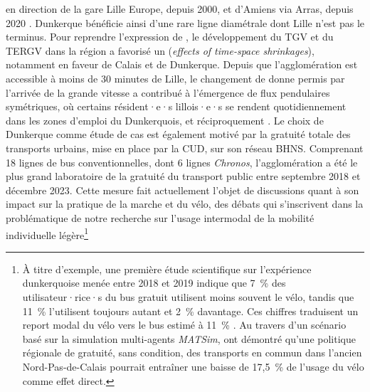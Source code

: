 \begin{refsegment}
{} en direction de la gare Lille Europe, depuis 2000, et d'Amiens via Arras, depuis 2020 \textcolor{blue}{\autocite[85-86]{bourdin_major_2024}}. Dunkerque bénéficie ainsi d'une rare ligne diamétrale dont Lille n'est pas le terminus. Pour reprendre l'expression de \textcolor{blue}{\textcite[102-103]{chen_wider_2012}}, le développement du \acrshort{TGV} et du \acrshort{TERGV} dans la région a favorisé un  (\textsl{effects of time-space shrinkages}), notamment en faveur de Calais et de Dunkerque. Depuis que l'agglomération est accessible à moins de 30 minutes de Lille, le changement de donne permis par l'arrivée de la grande vitesse a contribué à l'émergence de flux pendulaires symétriques, où certains résident·e·s lillois·e·s se rendent quotidiennement dans les zones d'emploi du Dunkerquois, et réciproquement \textcolor{blue}{\autocite[4]{deroo_deplacements_2008}}. Le choix de Dunkerque comme étude de cas est également motivé par la gratuité totale des transports urbains, mise en place par la \acrfull{CUD}, sur son réseau \acrshort{BHNS}. Comprenant 18 lignes de bus conventionnelles, dont 6 lignes \textsl{Chronos}, l'agglomération a été le plus grand laboratoire de la gratuité du transport public entre septembre 2018 et décembre 2023. Cette mesure fait actuellement l'objet de discussions quant à son impact sur la pratique de la marche et du vélo, des débats qui s'inscrivent dans la problématique de notre recherche sur l'usage intermodal de la mobilité individuelle légère\footnote{
    À titre d’exemple, une première étude scientifique sur l’expérience dunkerquoise menée entre 2018 et 2019 indique que 7~\% des utilisateur·rice·s du bus gratuit utilisent moins souvent le vélo, tandis que 11~\% l’utilisent toujours autant et 2~\% davantage. Ces chiffres traduisent un report modal du vélo vers le bus estimé à 11~\% \textcolor{blue}{\autocite[25]{javary_gratuite_2020}}. Au travers d'un scénario basé sur la simulation multi-agents \textsl{MATSim}, \textcolor{blue}{\textcite[10]{kilani_multimodal_2022}} ont démontré qu'une politique régionale de gratuité, sans condition, des transports en commun dans l'ancien Nord-Pas-de-Calais pourrait entraîner une baisse de 17,5~\% de l’usage du vélo comme effet direct.
}
\end{refsegment}
